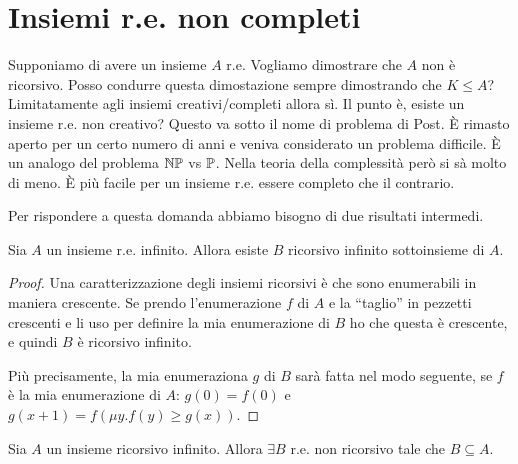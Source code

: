 \section{Insiemi r.e. non completi}

Supponiamo di avere un insieme $A$ r.e. Vogliamo dimostrare che $A$ non è ricorsivo. Posso condurre
questa dimostazione sempre dimostrando che $K \leq A$? Limitatamente agli insiemi creativi/completi
allora sì. Il punto è, esiste un insieme r.e. non creativo? Questo va sotto il nome di problema di
Post. È rimasto aperto per un certo numero di anni e veniva considerato un problema difficile.  È
un analogo del problema $\mathbb{NP}$ vs $\mathbb{P}$. Nella teoria della complessità però si sà molto di meno. È più
facile per un insieme r.e. essere completo che il contrario.

Per rispondere a questa domanda abbiamo bisogno di due risultati intermedi.

\begin{thm}
    Sia $A$ un insieme r.e. infinito. Allora esiste $B$ ricorsivo infinito sottoinsieme di $A$.
\end{thm}
\begin{proof}
    Una caratterizzazione degli insiemi ricorsivi è che sono enumerabili in maniera crescente. Se
    prendo l'enumerazione $f$ di $A$ e la ``taglio'' in pezzetti crescenti e li uso per definire la
    mia enumerazione di $B$ ho che questa è crescente, e quindi $B$ è ricorsivo infinito. 

    Più precisamente, la mia enumeraziona $g$ di $B$ sarà fatta nel modo seguente, se $f$ è la mia
    enumerazione di $A$: $g(0) = f(0)$ e $g(x+1) = f(\mu y. f(y) \geq g(x))$.
\end{proof}

\begin{thm}
    Sia $A$ un insieme ricorsivo infinito. Allora $\exists B$ r.e. non ricorsivo tale che $B \subseteq
    A$.
\end{thm}
%

